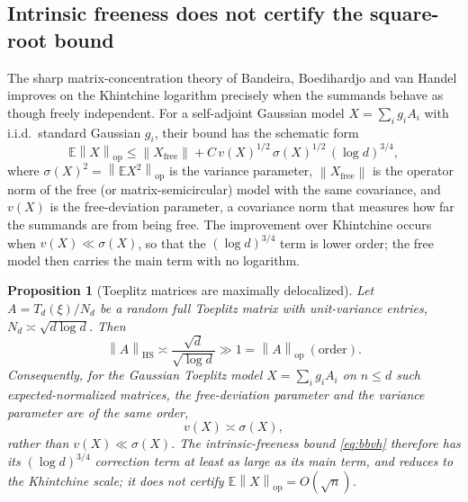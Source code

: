 \documentclass[11pt]{amsart}
\numberwithin{equation}{section}
\newtheorem{proposition}[theorem]{Proposition}
\theoremstyle{definition}
\theoremstyle{remark}
\newcommand{\op}{\mathrm{op}}
\newcommand{\HS}{\mathrm{HS}}
\newcommand{\Exp}{\mathbb E}
\newcommand{\norm}[1]{\left\lVert #1\right\rVert}
\begin{document}
\subsection{Intrinsic freeness does not certify the square-root bound}
\label{rem:bbvh}

The sharp matrix-concentration theory of Bandeira, Boedihardjo and van Handel
\cite{BBvH} improves on the Khintchine logarithm precisely when the summands
behave as though freely independent. For a self-adjoint Gaussian model
$X=\sum_ig_iA_i$ with i.i.d.\ standard Gaussian $g_i$, their bound has the schematic
form
\begin{equation}\label{eq:bbvh}
\Exp\norm{X}_{\op}\le\norm{X_{\mathrm{free}}}+
C\,v(X)^{1/2}\,\sigma(X)^{1/2}\,(\log d)^{3/4},
\end{equation}
where $\sigma(X)^2=\norm{\Exp X^2}_{\op}$ is the variance parameter,
$\norm{X_{\mathrm{free}}}$ is the operator norm of the free (or matrix-semicircular)
model with the same covariance, and $v(X)$ is the free-deviation parameter, a
covariance norm that measures how far the summands are from being free. The
improvement over Khintchine occurs when $v(X)\ll\sigma(X)$, so that the
$(\log d)^{3/4}$ term is lower order; the free model then carries the main term
with no logarithm.

\begin{proposition}[Toeplitz matrices are maximally delocalized]
\label{prop:bbvh}
Let $A=T_d(\xi)/N_d$ be a random full Toeplitz matrix with unit-variance
entries, $N_d\asymp\sqrt{d\log d}$. Then
\[
\norm{A}_{\HS}\asymp\frac{\sqrt d}{\sqrt{\log d}}\gg1=\norm{A}_{\op}\ (\text{order}).
\]
Consequently, for the Gaussian Toeplitz model $X=\sum_ig_iA_i$ on $n\le d$ such
expected-normalized matrices, the free-deviation parameter and the variance
parameter are of the same order,
\[
v(X)\asymp\sigma(X),
\]
rather than $v(X)\ll\sigma(X)$. The intrinsic-freeness bound \eqref{eq:bbvh}
therefore has its $(\log d)^{3/4}$ correction term at least as large as its main
term, and reduces to the Khintchine scale; it does not certify
$\Exp\norm{X}_{\op}=O(\sqrt n)$.
\end{proposition}
\end{document}
